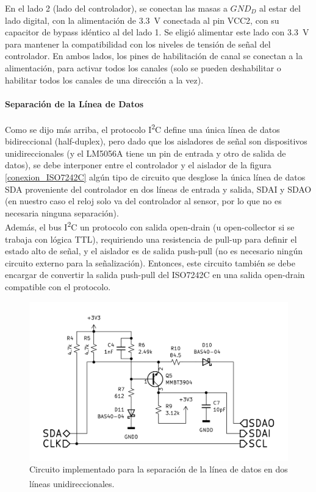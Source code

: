 En el lado 2 (lado del controlador), se conectan las masas a $GND_D$ al estar del lado digital, con la alimentación de \SI[]{3.3}[]{\volt} conectada al pin VCC2, con su capacitor de bypass idéntico al del lado 1. Se eligió alimentar este lado con \SI[]{3.3}[]{\volt} para mantener la compatibilidad con los niveles de tensión de señal del controlador. En ambos lados, los pines de habilitación de canal se conectan a la alimentación, para activar todos los canales (solo se pueden deshabilitar o habilitar todos los canales de una dirección a la vez).\\

\paragraph{Separación de la Línea de Datos}

Como se dijo más arriba, el protocolo I\textsuperscript{2}C define una única línea de datos bidireccional (half-duplex), pero dado que los aisladores de señal son dispositivos unidireccionales (y el LM5056A tiene un pin de entrada y otro de salida de datos), se debe interponer entre el controlador y el aislador de la figura \ref{conexion_ISO7242C} algún tipo de circuito que desglose la única línea de datos SDA proveniente del controlador en dos líneas de entrada y salida, SDAI y SDAO (en nuestro caso el reloj solo va del controlador al sensor, por lo que no es necesaria ninguna separación).\\

Además, el bus I\textsuperscript{2}C un protocolo con salida open-drain (u open-collector si se trabaja con lógica TTL), requiriendo una resistencia de pull-up para definir el estado alto de señal, y el aislador es de salida push-pull (no es necesario ningún circuito externo para la señalización). Entonces, este circuito también se debe encargar de convertir la salida push-pull del ISO7242C en una salida open-drain compatible con el protocolo.\\

\begin{figure}[h]
    \centering
    \includegraphics[scale=1.2]{Imagenes/Circuito Separacion I2C.png}
    \caption{Circuito implementado para la separación de la línea de datos en dos líneas unidireccionales.\textsuperscript{\cite{I2C-ISO}}}
    \label{circuito_sep_i2c}
\end{figure}

